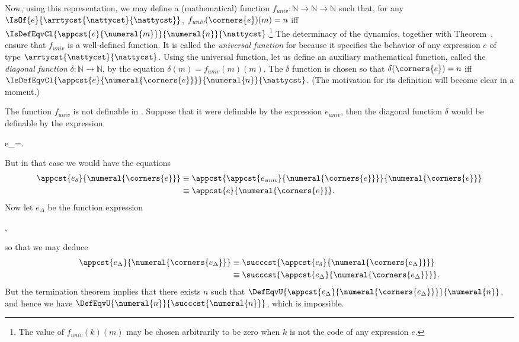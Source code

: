 Now, using this representation, we may define a (mathematical) function
$f_{\textit{univ}}:\mathbb{N}\to\mathbb{N}\to\mathbb{N}$ such that, for any
$\IsOf{e}{\arrtycst{\nattycst}{\nattycst}}$,
$f_{\textit{univ}}(\corners{e})(m)=n$ iff
$\IsDefEqvCl{\appcst{e}{\numeral{m}}}{\numeral{n}}{\nattycst}$.\footnote{The
  value of $f_{\textit{univ}}(k)(m)$ may be chosen arbitrarily to be zero when
  $k$ is not the code of any expression $e$.}  The determinacy of the dynamics,
together with Theorem~, ensure that
$f_{\textit{univ}}$ is a well-defined function.  It is called the
\emph{universal function} for \LangT{} because it specifies the behavior of
any expression $e$ of type $\arrtycst{\nattycst}{\nattycst}$.  Using the
universal function, let us define an auxiliary mathematical function, called the
\emph{diagonal function} $\delta:\mathbb{N}\to\mathbb{N}$, by the equation
$\delta(m)=f_{\textit{univ}}(m)(m)$.  The $\delta$ function is chosen so that
$\delta(\corners{e})=n$ iff
$\IsDefEqvCl{\appcst{e}{\numeral{\corners{e}}}}{\numeral{n}}{\nattycst}$.  (The
motivation for its definition will become clear in a moment.)

The function $f_{\textit{univ}}$ is not definable in \LangT{}.  Suppose
that it were definable by the expression $e_{\textit{univ}}$, then the diagonal
function $\delta$ would be definable by the expression 
\begin{displayed*}
e_{\delta}=.
\end{displayed*}
But in that case we would have the equations
\begin{align*}
  \appcst{e_{\delta}}{\numeral{\corners{e}}} & \equiv
  \appcst{\appcst{e_{\textit{univ}}}{\numeral{\corners{e}}}}{\numeral{\corners{e}}}
  \\
  & \equiv \appcst{e}{\numeral{\corners{e}}}.
\end{align*}
Now let $e_{\Delta}$ be the function expression
\begin{displayed*}
,
\end{displayed*}
so that we may deduce
\begin{align*}
  \appcst{e_{\Delta}}{\numeral{\corners{e_{\Delta}}}}
  & \equiv \succcst{\appcst{e_{\delta}}{\numeral{\corners{e_{\Delta}}}}} \\
  & \equiv \succcst{\appcst{e_{\Delta}}{\numeral{\corners{e_{\Delta}}}}}.
\end{align*}
But the termination theorem implies that there exists $n$ such that
$\DefEqvU{\appcst{e_{\Delta}}{\numeral{\corners{e_{\Delta}}}}}{\numeral{n}}$, and hence we
have $\DefEqvU{\numeral{n}}{\succcst{\numeral{n}}}$, which is impossible.

